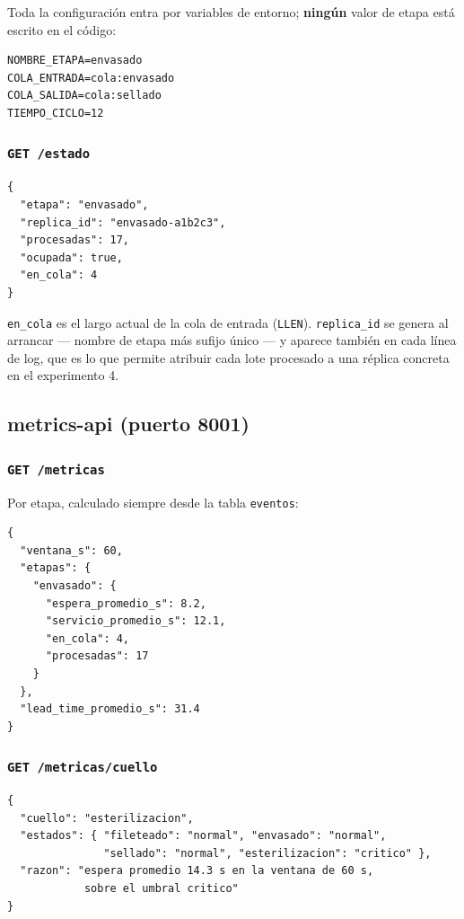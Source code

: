 \documentclass[12pt,a4paper]{article}
\begin{document}
Toda la configuración entra por variables de entorno; \textbf{ningún} valor de
etapa está escrito en el código:

\begin{lstlisting}
NOMBRE_ETAPA=envasado
COLA_ENTRADA=cola:envasado
COLA_SALIDA=cola:sellado
TIEMPO_CICLO=12
\end{lstlisting}

\subsubsection*{\texttt{GET /estado}}

\begin{lstlisting}
{
  "etapa": "envasado",
  "replica_id": "envasado-a1b2c3",
  "procesadas": 17,
  "ocupada": true,
  "en_cola": 4
}
\end{lstlisting}

\texttt{en\_cola} es el largo actual de la cola de entrada (\texttt{LLEN}).
\texttt{replica\_id} se genera al arrancar — nombre de etapa más sufijo único —
y aparece también en cada línea de log, que es lo que permite atribuir cada lote
procesado a una réplica concreta en el experimento 4.

\subsection{metrics-api (puerto 8001)}

\subsubsection*{\texttt{GET /metricas}}

Por etapa, calculado siempre desde la tabla \texttt{eventos}:

\begin{lstlisting}
{
  "ventana_s": 60,
  "etapas": {
    "envasado": {
      "espera_promedio_s": 8.2,
      "servicio_promedio_s": 12.1,
      "en_cola": 4,
      "procesadas": 17
    }
  },
  "lead_time_promedio_s": 31.4
}
\end{lstlisting}

\subsubsection*{\texttt{GET /metricas/cuello}}

\begin{lstlisting}
{
  "cuello": "esterilizacion",
  "estados": { "fileteado": "normal", "envasado": "normal",
               "sellado": "normal", "esterilizacion": "critico" },
  "razon": "espera promedio 14.3 s en la ventana de 60 s,
            sobre el umbral critico"
}
\end{lstlisting}
\end{document}
